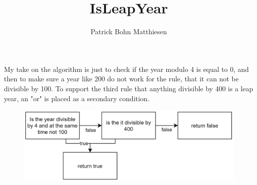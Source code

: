 \documentclass{article}
\title{IsLeapYear}
\author{Patrick Bohn Matthiesen}
\date{}
\begin{document}
\maketitle
My take on the algorithm is just to check if the year modulo 4 is equal to 0, and then to make sure a year like 200 do not work for the rule, that it can not be divisible by 100. To support the third rule that anything divisible by 400 is a leap year, an "or" is placed as a secondary condition.
\begin{figure}[h]
\centering
\includegraphics[width=\textwidth]{images/image.png}
\end{figure}
\end{document}
